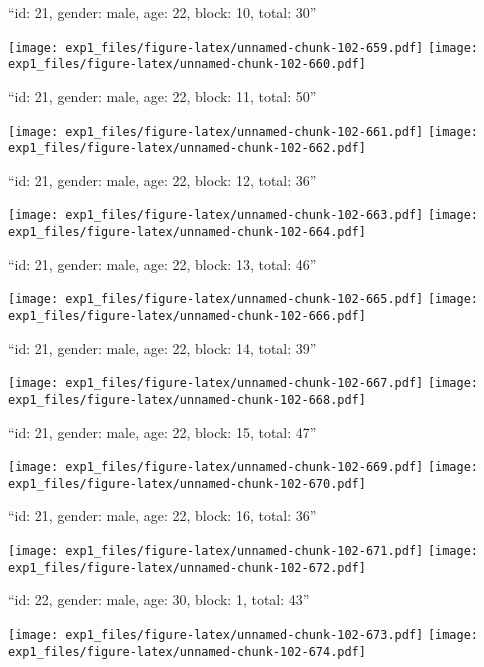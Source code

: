 \documentclass[11pt,,]{article}
\begin{document}
\newpage
[1] 

``id: 21, gender: male, age: 22, block: 10, total: 30''

\texttt{[image: exp1\_files/figure-latex/unnamed-chunk-102-659.pdf]}
\texttt{[image: exp1\_files/figure-latex/unnamed-chunk-102-660.pdf]}

\newpage
[1] 

``id: 21, gender: male, age: 22, block: 11, total: 50''

\texttt{[image: exp1\_files/figure-latex/unnamed-chunk-102-661.pdf]}
\texttt{[image: exp1\_files/figure-latex/unnamed-chunk-102-662.pdf]}

\newpage
[1] 

``id: 21, gender: male, age: 22, block: 12, total: 36''

\texttt{[image: exp1\_files/figure-latex/unnamed-chunk-102-663.pdf]}
\texttt{[image: exp1\_files/figure-latex/unnamed-chunk-102-664.pdf]}

\newpage
[1] 

``id: 21, gender: male, age: 22, block: 13, total: 46''

\texttt{[image: exp1\_files/figure-latex/unnamed-chunk-102-665.pdf]}
\texttt{[image: exp1\_files/figure-latex/unnamed-chunk-102-666.pdf]}

\newpage
[1] 

``id: 21, gender: male, age: 22, block: 14, total: 39''

\texttt{[image: exp1\_files/figure-latex/unnamed-chunk-102-667.pdf]}
\texttt{[image: exp1\_files/figure-latex/unnamed-chunk-102-668.pdf]}

\newpage
[1] 

``id: 21, gender: male, age: 22, block: 15, total: 47''

\texttt{[image: exp1\_files/figure-latex/unnamed-chunk-102-669.pdf]}
\texttt{[image: exp1\_files/figure-latex/unnamed-chunk-102-670.pdf]}

\newpage
[1] 

``id: 21, gender: male, age: 22, block: 16, total: 36''

\texttt{[image: exp1\_files/figure-latex/unnamed-chunk-102-671.pdf]}
\texttt{[image: exp1\_files/figure-latex/unnamed-chunk-102-672.pdf]}

\newpage
[1] 

``id: 22, gender: male, age: 30, block: 1, total: 43''

\texttt{[image: exp1\_files/figure-latex/unnamed-chunk-102-673.pdf]}
\texttt{[image: exp1\_files/figure-latex/unnamed-chunk-102-674.pdf]}
\end{document}
